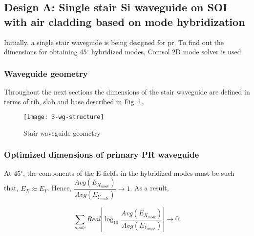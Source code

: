 \documentclass[../report.tex]{subfiles}
\begin{document}
		\subsection{Design A: Single stair Si waveguide on SOI with air cladding based on mode hybridization}
Initially, a single stair waveguide is being designed for \gls{pr}. To find out the dimensions for obtaining $45{^\circ}$ hybridized modes, Comsol 2D mode solver is used. 

\subsubsection{Waveguide geometry}
Throughout the next sections the dimensions of the stair waveguide are defined in terms of rib, slab and base described in Fig. \ref{fig:3_wg_structure}.   

\begin{figure}[H] %
	\centering
	\texttt{[image: 3-wg-structure]}
	\caption{Stair waveguide geometry}
	\label{fig:3_wg_structure}
\end{figure}


\subsubsection{Optimized dimensions of primary PR waveguide}
At $45{^\circ}$, the components of the E-fields in the hybridized modes must be such that, $E_X \approx E_Y$. Hence, $\dfrac {Avg(E_{X_{mode}})} {Avg(E_{Y_{mode}})} \rightarrow 1$. As a result, 

\begin{equation}\label{eq:wg_dim_eq}
\sum _{mode}Real\left| \log _{10}\dfrac {Avg(E_{X_{mode}})} {Avg(E_{Y_{mode}})}\right| \rightarrow 0. 
\end{equation}
\end{document}
